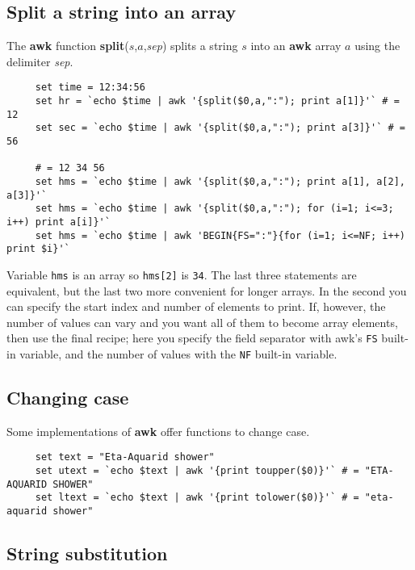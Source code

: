 \documentclass[twoside,11pt]{article}
\newcommand{\xlabel}[1]{}
\begin{document}
\subsection{\xlabel{sc4_se_string_split}Split a string into an
array\label{sc4_se_string_split}}

The {\bf awk} function {\bf split}($s$,$a$,{\em sep}) splits a string
$s$ into an {\bf awk} array $a$ using the delimiter {\em sep}.

\small
\begin{verbatim}
     set time = 12:34:56
     set hr = `echo $time | awk '{split($0,a,":"); print a[1]}'` # = 12
     set sec = `echo $time | awk '{split($0,a,":"); print a[3]}'` # = 56

     # = 12 34 56
     set hms = `echo $time | awk '{split($0,a,":"); print a[1], a[2], a[3]}'`
     set hms = `echo $time | awk '{split($0,a,":"); for (i=1; i<=3; i++) print a[i]}'`
     set hms = `echo $time | awk 'BEGIN{FS=":"}{for (i=1; i<=NF; i++) print $i}'`
\end{verbatim}
\normalsize
Variable {\tt hms} is an array so {\tt hms[2]} is {\tt 34}.
The last three statements are equivalent, but the last two more
convenient for longer arrays.  In the second you can specify the start
index and number of elements to print.  If, however, the number of
values can vary and you want all of them to become array elements,
then use the final recipe; here you specify the field separator with
awk's {\tt FS} built-in variable, and the number of values with the
{\tt NF} built-in variable.

\subsection{\xlabel{sc4_se_string_case}Changing case
\label{sc4_se_string_case}}

Some implementations of {\bf awk} offer functions to change case.

\small
\begin{verbatim}
     set text = "Eta-Aquarid shower"
     set utext = `echo $text | awk '{print toupper($0)}'` # = "ETA-AQUARID SHOWER"
     set ltext = `echo $text | awk '{print tolower($0)}'` # = "eta-aquarid shower"
\end{verbatim}
\normalsize


\subsection{\xlabel{sc4_se_string_sub}String substitution
\label{sc4_se_string_sub}}
\end{document}
